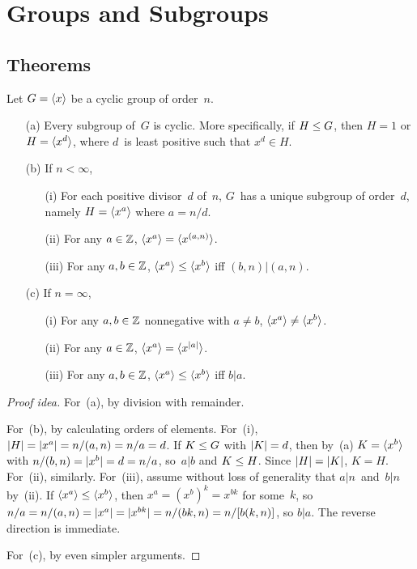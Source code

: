 %
%
%
\section{Groups and Subgroups}
\subsection*{Theorems}
\begin{thm}
Let \(G=\langle{x}\rangle\) be a cyclic group of order~\(n\).
\begin{enumerate}[itemsep=0pt]
\item[(a)] Every subgroup of~\(G\) is cyclic. More specifically, if \(H\le G\), then \(H=1\) or \(H=\langle{x^d}\rangle\), where \(d\)~is least positive such that \(x^d\in H\).
\item[(b)] If \(n<\infty\),
\begin{enumerate}[itemsep=0pt]
\item[(i)] For each positive divisor~\(d\) of~\(n\), \(G\)~has a unique subgroup of order~\(d\), namely \(H=\langle{x^a}\rangle\) where \(a=n/d\).
\item[(ii)] For any \(a\in\mathbb{Z}\), \(\langle{x^a}\rangle=\langle{x^{(a,n)}}\rangle\).
\item[(iii)] For any \(a,b\in\mathbb{Z}\), \(\langle{x^a}\rangle\le\langle{x^b}\rangle\) iff \((b,n)|(a,n)\).
\end{enumerate}
\item[(c)] If \(n=\infty\),
\begin{enumerate}[itemsep=0pt]
\item[(i)] For any \(a,b\in\mathbb{Z}\) nonnegative with \(a\ne b\), \(\langle{x^a}\rangle\ne\langle{x^b}\rangle\).
\item[(ii)] For any \(a\in\mathbb{Z}\), \(\langle{x^a}\rangle=\langle{x^{|{a}|}}\rangle\).
\item[(iii)] For any \(a,b\in\mathbb{Z}\), \(\langle{x^a}\rangle\le\langle{x^b}\rangle\) iff \(b|a\).
\end{enumerate}
\end{enumerate}
\end{thm}
\begin{proof}[Proof idea]
For~(a), by division with remainder.

For~(b), by calculating orders of elements. For~(i), \(|{H}|=|{x^a}|=n/(a,n)=n/a=d\). If \(K\le G\) with \(|{K}|=d\), then by~(a) \(K=\langle{x^b}\rangle\) with \(n/(b,n)=|{x^b}|=d=n/a\), so~\(a|b\) and \(K\le H\). Since \(|{H}|=|{K}|\), \(K=H\). For~(ii), similarly. For~(iii), assume without loss of generality that \(a|n\)~and~\(b|n\) by~(ii). If \(\langle{x^a}\rangle\le\langle{x^b}\rangle\), then \(x^a=(x^b)^k=x^{bk}\) for some~\(k\), so \(n/a=n/(a,n)=|{x^a}|=|{x^{bk}}|=n/(bk,n)=n/[b(k,n)]\), so \(b|a\). The reverse direction is immediate.

For~(c), by even simpler arguments.\qedhere
\end{proof}
